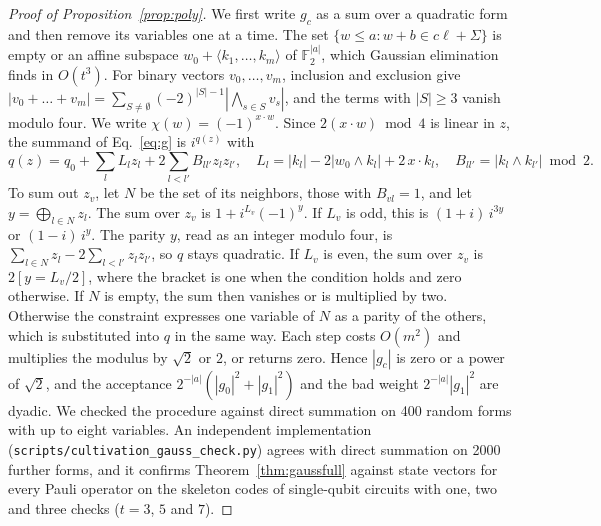 \documentclass[aps,prl,reprint,twocolumn,amsmath,amssymb,floatfix,nofootinbib,superscriptaddress]{revtex4-2}
\theoremstyle{definition}
\theoremstyle{remark}
\newcommand{\F}{\mathbb F_2}
\begin{document}
\begin{proof}[Proof of Proposition~\ref{prop:poly}]
We first write $g_c$ as a sum over a quadratic form and then remove its variables one at a time. The set $\{w\leq a: w+b\in c\ell+\Sigma\}$ is empty or an affine subspace $w_0+\langle k_1,\dots,k_m\rangle$ of $\F^{|a|}$, which Gaussian elimination finds in $O(t^3)$. For binary vectors $v_0,\dots,v_m$, inclusion and exclusion give $|v_0+\dots+v_m|=\sum_{S\neq\emptyset}(-2)^{|S|-1}|\bigwedge_{s\in S}v_s|$, and the terms with $|S|\geq3$ vanish modulo four. We write $\chi(w)=(-1)^{x\cdot w}$. Since $2(x\cdot w)\bmod4$ is linear in $z$, the summand of Eq.~\eqref{eq:g} is $i^{q(z)}$ with
\begin{equation}
 q(z)=q_0+\sum_lL_lz_l+2\sum_{l<l'}B_{ll'}z_lz_{l'},\quad L_l=|k_l|-2|w_0\wedge k_l|+2\,x\cdot k_l,\quad B_{ll'}=|k_l\wedge k_{l'}|\bmod2 .
\end{equation}
To sum out $z_v$, let $N$ be the set of its neighbors, those with $B_{vl}=1$, and let $y=\bigoplus_{l\in N}z_l$. The sum over $z_v$ is $1+i^{L_v}(-1)^y$. If $L_v$ is odd, this is $(1+i)\,i^{3y}$ or $(1-i)\,i^{y}$. The parity $y$, read as an integer modulo four, is $\sum_{l\in N}z_l-2\sum_{l<l'}z_lz_{l'}$, so $q$ stays quadratic. If $L_v$ is even, the sum over $z_v$ is $2[y=L_v/2]$, where the bracket is one when the condition holds and zero otherwise. If $N$ is empty, the sum then vanishes or is multiplied by two. Otherwise the constraint expresses one variable of $N$ as a parity of the others, which is substituted into $q$ in the same way. Each step costs $O(m^2)$ and multiplies the modulus by $\sqrt2$ or $2$, or returns zero. Hence $|g_c|$ is zero or a power of $\sqrt2$, and the acceptance $2^{-|a|}(|g_0|^2+|g_1|^2)$ and the bad weight $2^{-|a|}|g_1|^2$ are dyadic. We checked the procedure against direct summation on 400 random forms with up to eight variables. An independent implementation (\texttt{scripts/cultivation\_gauss\_check.py}) agrees with direct summation on 2000 further forms, and it confirms Theorem~\ref{thm:gaussfull} against state vectors for every Pauli operator on the skeleton codes of single-qubit circuits with one, two and three checks ($t=3$, $5$ and $7$).
\end{proof}
\end{document}
